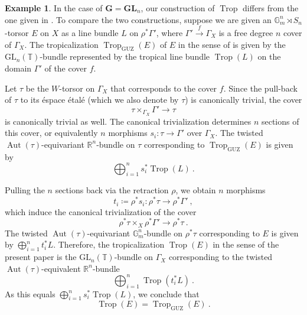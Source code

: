 \documentclass[10pt, a4paper]{amsart}
\theoremstyle{definition}
\newtheorem{example}[theorem]{Example}
\theoremstyle{myitemstyle}
\newcommand{\R}{\mathbb{R}}
\newcommand{\G}{\mathbb{G}}
\newcommand{\T}{\mathbb{T}}
\DeclareMathOperator{\Aut}{Aut}
\DeclareMathOperator{\Trop}{Trop}
\newcommand{\GL}{{\mathrm{GL}}}
\begin{document}
\begin{example}
In the case of $\mathbf G= \mathbf{GL}_n$, our construction of $\Trop$ differs from the one given in \cite{2022GrossUlirschZakharov}. To compare the two constructions, suppose we are given an $\G_m^n\rtimes S_n$-torsor $E$ on $X$ as a line bundle $L$ on $\rho^*\Gamma'$, where $\Gamma'\xrightarrow{f} \Gamma_X$ is a free degree $n$ cover of $\Gamma_X$. The tropicalization $\Trop_{\mathrm{GUZ}}(E)$ of $E$ in the sense of \cite{2022GrossUlirschZakharov} is given by the $\GL_n(\T)$-bundle represented by the tropical line bundle $\Trop(L)$ on the domain $\Gamma'$ of the cover $f$. 

Let $\tau$ be the $W$-torsor on $\Gamma_X$ that corresponds to the cover $f$. Since the pull-back of $\tau$ to its \'espace \'etal\'e (which we also denote by $\tau$) is canonically trivial, the cover 
\[
    \tau\times_{\Gamma_X}\Gamma' \to \tau
\]
is canonically trivial as well. The canonical trivialization determines $n$ sections of this cover, or equivalently $n$ morphisms $s_i\colon \tau\to \Gamma'$ over $\Gamma_X$. The twisted $\Aut(\tau)$-equivariant $\R^n$-bundle on $\tau$ corresponding to $\Trop_{\mathrm{GUZ}}(E)$ is given by 
\[
    \bigoplus_{i=1}^n s_i^*\Trop(L) \ .
\]

Pulling the $n$ sections back via the retraction $\rho$, we obtain $n$ morphisms 
\[
    t_i\coloneqq \rho^*s_i\colon\rho^*\tau\longrightarrow \rho^*\Gamma' \ ,
\]
which induce the canonical trivialization of the cover 
\[
    \rho^*\tau\times_X \rho^*\Gamma'\longrightarrow \rho^*\tau \ . 
\]
The twisted $\Aut(\tau)$-equivariant $\G_m^n$-bundle on $\rho^*\tau$ corresponding to $E$ is given by $\bigoplus_{i=1}^n t_i^*L$. Therefore, the tropicalization $\Trop(E)$ in the sense of the present paper is the $\GL_n(\T)$-bundle on $\Gamma_X$ corresponding to the twisted $\Aut(\tau)$-equivalent $\R^n$-bundle 
\[
    \bigoplus_{i=1}^n \Trop(t_i^*L) \ .
\]
As this equals $\bigoplus_{i=1}^n s_i^*\Trop(L)$, we conclude that
\[
    \Trop(E)=\Trop_{\mathrm{GUZ}}(E) \ .
\]
\end{example}
\end{document}
